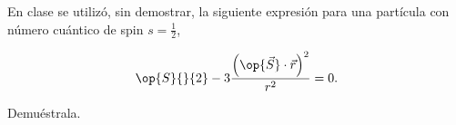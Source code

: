 \documentclass[./../main.tex]{subfiles}
\begin{document}
    \begin{exercise}
        En clase se utilizó, sin demostrar, la siguiente expresión para una partícula con número cuántico de spin \(s = \tfrac{1}{2}\),

        \begin{equation*}
            \op{S}{}{2} - 3\dfrac{\left(\op{\vec{S}} \cdot \vec{r}\right)^{2}}{r^{2}} = 0.
        \end{equation*}

        Demuéstrala.
    \end{exercise}
\end{document}
